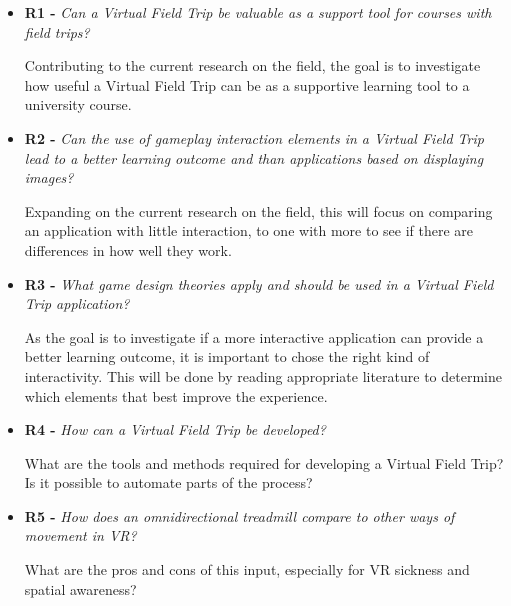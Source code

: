     \begin{itemize}
        \item \textbf{R1 - } \emph{Can a Virtual Field Trip be valuable as a support tool for courses with field trips?}
        
        Contributing to the current research on the field, the goal is to investigate how useful a Virtual Field Trip can be as a supportive learning tool to a university course.
        
        \SPACE
        
        \item \textbf{R2 - } \emph{Can the use of gameplay interaction elements in a Virtual Field Trip lead to a better learning outcome and than applications based on displaying images?}
        
        Expanding on the current research on the field, this will focus on comparing an application with little interaction, to one with more to see if there are differences in how well they work.
        
        \SPACE
        
        \item \textbf{R3 - } \emph{What game design theories apply and should be used in a Virtual Field Trip application?}
        
        As the goal is to investigate if a more interactive application can provide a better learning outcome, it is important to chose the right kind of interactivity. This will be done by reading appropriate literature to determine which elements that best improve the experience. 
        
        \SPACE
        
        \item \textbf{R4 - } \emph{How can a Virtual Field Trip be developed?}
        
        What are the tools and methods required for developing a Virtual Field Trip? Is it possible to automate parts of the process?
        
        \SPACE
        
        \item \textbf{R5 - } \emph{How does an omnidirectional treadmill compare to other ways of movement in VR?}
        
        What are the pros and cons of this input, especially for VR sickness and spatial awareness?
    \end{itemize}
    
    
